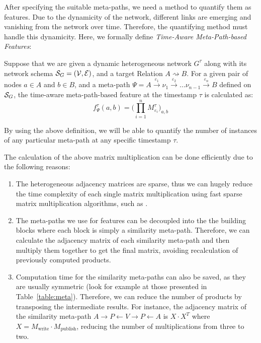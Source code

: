 After specifying the suitable meta-paths, we need a method to quantify them as features. Due to the dynamicity of the network, different links are emerging and vanishing from the network over time. Therefore, the quantifying method must handle this dynamicity. Here, we formally define \emph{Time-Aware Meta-Path-based Features}:

\begin{definition}
	Suppose that we are given a dynamic heterogeneous network $G^{\tau}$ along with its network schema $\mathcal{S}_G=(\mathcal{V}, \mathcal{E})$, and a target Relation $A\rightsquigarrow B$. {\color{red}For a given pair of nodes $a\in A$ and $b\in B$, and a meta-path $\Psi=A\xrightarrow{\varepsilon_1}\nu_1\xrightarrow{\varepsilon_2}\dots\nu_{n-1}\xrightarrow{\varepsilon_{n}}B$ defined on $\mathcal{S}_G$, the time-aware meta-path-based feature at the timestamp $\tau$ is calculated as:
	\begin{equation*}
		f_{\Psi}^\tau(a,b)=\Big(\prod_{i=1}^{n}M^\tau_{\varepsilon_i}\Big)_{a,b}
	\end{equation*}}
\end{definition}

By using the above definition, we will be able to quantify the number of instances of any particular meta-path at any specific timestamp $\tau$. {\color{red}The calculation of the above matrix multiplication can be done efficiently due to the following reasons:
\begin{enumerate}
\item The heterogeneous adjacency matrices are sparse, thus we can hugely reduce the time complexity of each single matrix multiplication using fast sparse matrix multiplication algorithms, such as \cite{yuster2005fast}.
\item The meta-paths we use for features can be decoupled into the the building blocks where each block is simply a similarity meta-path. Therefore, we can calculate the adjacency matrix of each similarity meta-path and then multiply them together to get the final matrix, avoiding recalculation of previously computed products.
\item Computation time for the similarity meta-paths can also be saved, as they are usually symmetric (look for example at those presented in Table~\ref{table:meta}). Therefore, we can reduce the number of products by transposing the intermediate results. For instance, the adjacency matrix of the similarity meta-path $A\rightarrow P\leftarrow V\rightarrow P\leftarrow A$ is $X\cdot X^T$ where $X=M_{\text{write}}\cdot M_{\text{publish}}$, reducing the number of multiplications from three to two.
\end{enumerate}
}

